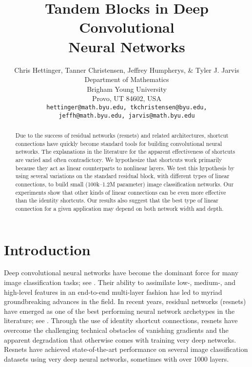 \documentclass{article} %
\title{Tandem Blocks in Deep Convolutional\\ Neural Networks}
\author{Chris Hettinger, Tanner Christensen, Jeffrey Humpherys, \& Tyler J. Jarvis \\
Department of Mathematics\\
Brigham Young University\\
Provo, UT 84602, USA \\
\texttt{hettinger@math.byu.edu, tkchristensen@byu.edu,} \\ 
\texttt{jeffh@math.byu.edu, jarvis@math.byu.edu} \\
}
\begin{document}
\maketitle

\begin{abstract}
Due to the success of residual networks (resnets) and related architectures, shortcut connections have quickly become standard tools for building convolutional neural networks. The explanations in the literature for the apparent effectiveness of shortcuts are varied and often contradictory.  We hypothesize that shortcuts work primarily because they act as linear counterparts to nonlinear layers.  We test this hypothesis by using several variations on the standard residual block, with different types of linear connections, to build small (100k--1.2M parameter) image classification networks. Our experiments show that other kinds of linear connections can be even more effective than the identity shortcuts. Our results also suggest that the best type of linear connection for a given application may depend on both network width and depth.
\end{abstract}

\section{Introduction}
\label{introduction}

Deep convolutional neural networks have become the dominant force for many image classification tasks; see \cite{CNN,VeryDeep,Inception}.  Their ability to assimilate low-, medium-, and high-level features in an end-to-end multi-layer fashion has led to myriad groundbreaking advances in the field.  In recent years, residual networks (resnets) have emerged as one of the best performing neural network archetypes in the literature; see \cite{ResNets}.  Through the use of identity shortcut connections, resnets have overcome the challenging technical obstacles of vanishing gradients and the apparent degradation that otherwise comes with training very deep networks. Resnets have achieved state-of-the-art performance on several image classification datasets using very deep neural networks, sometimes with over 1000 layers.
\end{document}
